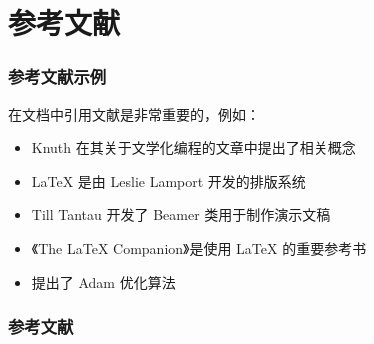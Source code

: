 \section{参考文献}
\begin{frame}
\frametitle{参考文献示例}
在文档中引用文献是非常重要的，例如：
\begin{itemize}
  \item Knuth 在其关于文学化编程的文章中提出了相关概念~\cite{knuth1984}
  \item LaTeX 是由 Leslie Lamport 开发的排版系统~\cite{lamport1994}
  \item Till Tantau 开发了 Beamer 类用于制作演示文稿~\cite{tantau2004}
  \item 《The LaTeX Companion》是使用 LaTeX 的重要参考书~\cite{mittelbach2004}
  \item 提出了 Adam 优化算法\cite{kingma2017adammethodstochasticoptimization} 
\end{itemize}
\end{frame}

\begin{frame}[allowframebreaks]
\frametitle{参考文献}
\printbibliography[heading=bibliography,title=参考文献]
\end{frame}